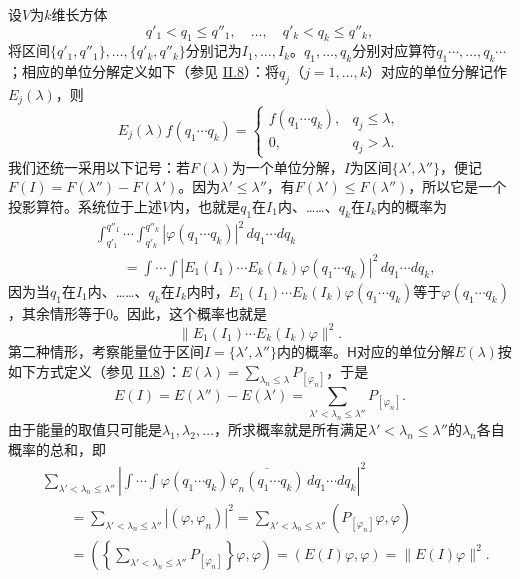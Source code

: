 \documentclass[fontsize=13pt,twoside,openany,headings=normal,parskip=false,bookmarkpackage=false,DIV=calc]{scrbook}
\begin{document}
设$V$为$k$维长方体
\[
q'_1<q_1\le q''_1,\quad\ldots,\quad q'_k<q_k\le q''_k,
\]
将区间$\{q'_1,\allowbreak q''_1\},\allowbreak \ldots,\allowbreak \{q'_k,\allowbreak q''_k\}$分别记为$I_1,\allowbreak \ldots,\allowbreak I_k$。$q_1,\allowbreak \ldots,\allowbreak q_k$分别对应算符$q_1\cdots,\allowbreak \ldots,\allowbreak q_k\cdots$；相应的单位分解定义如下（参见 \hyperref[sec:II.8]{II.8}）：将$q_j$（$j=1,\allowbreak \ldots,\allowbreak k$）对应的单位分解记作$E_j(\lambda)$，则
\[
E_j(\lambda)f(q_1\cdots q_k)=
\begin{cases}f(q_1\cdots q_k),&q_j\le\lambda,\\0,&q_j>\lambda.\end{cases}
\]
我们还统一采用以下记号：若$F(\lambda)$为一个单位分解，$I$为区间$\{\lambda',\allowbreak \lambda''\}$，便记$F(I)=F(\lambda'')-F(\lambda')$。因为$\lambda'\le\lambda''$，有$F(\lambda')\le F(\lambda'')$，所以它是一个投影算符。系统位于上述$V$内，也就是$q_1$在$I_1$内、……、$q_k$在$I_k$内的概率为
\begin{align*}
&\int_{q'_1}^{q''_1}\cdots\int_{q'_k}^{q''_k}|\varphi(q_1\cdots q_k)|^2\,dq_1\cdots dq_k\\
&\qquad=\int\cdots\int|E_1(I_1)\cdots E_k(I_k)\varphi(q_1\cdots q_k)|^2\,dq_1\cdots dq_k,
\end{align*}
因为当$q_1$在$I_1$内、……、$q_k$在$I_k$内时，$E_1(I_1)\cdots E_k(I_k)\varphi(q_1\cdots q_k)$等于$\varphi(q_1\cdots q_k)$，其余情形等于$0$。因此，这个概率也就是
\[
\|E_1(I_1)\cdots E_k(I_k)\varphi\|^2.
\]
第二种情形，考察能量位于区间$I=\{\lambda',\allowbreak \lambda''\}$内的概率。$\mathsf H$对应的单位分解$E(\lambda)$按如下方式定义（参见 \hyperref[sec:II.8]{II.8}）：$E(\lambda)=\sum_{\lambda_n\le\lambda}P_{[\varphi_n]}$，于是
\[
E(I)=E(\lambda'')-E(\lambda')=\sum_{\lambda'<\lambda_n\le\lambda''}P_{[\varphi_n]}.
\]
由于能量的取值只可能是$\lambda_1,\allowbreak \lambda_2,\allowbreak \ldots$，所求概率就是所有满足$\lambda'<\lambda_n\le\lambda''$的$\lambda_n$各自概率的总和，即
\begin{align*}
&\sum_{\lambda'<\lambda_n\le\lambda''}
\left|\int\cdots\int\varphi(q_1\cdots q_k)\overline{\varphi_n(q_1\cdots q_k)}\,dq_1\cdots dq_k\right|^2\\
&\qquad=\sum_{\lambda'<\lambda_n\le\lambda''}|(\varphi,\varphi_n)|^2
=\sum_{\lambda'<\lambda_n\le\lambda''}(P_{[\varphi_n]}\varphi,\varphi)\\
&\qquad=\left(\left\{\sum_{\lambda'<\lambda_n\le\lambda''}P_{[\varphi_n]}\right\}\varphi,\varphi\right)
=(E(I)\varphi,\varphi)=\|E(I)\varphi\|^2.
\end{align*}
\end{document}

